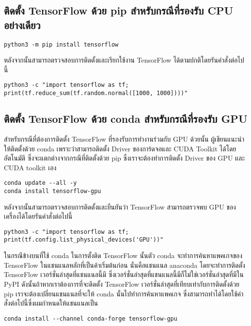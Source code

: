 \subsection{ติดตั้ง TensorFlow ด้วย pip สำหรับกรณีที่รองรับ CPU อย่างเดียว}

\begin{lstlisting}[style=MyBash]
python3 -m pip install tensorflow
\end{lstlisting}

หลังจากนั้นสามารถตรวจสอบการติดตั้งและเรียกใช้งาน TensorFlow ได้ตามปกติโดยรันคำสั่งต่อไปนี้

\begin{lstlisting}[style=MyBash]
python3 -c "import tensorflow as tf; print(tf.reduce_sum(tf.random.normal([1000, 1000])))"
\end{lstlisting}

\subsection{ติดตั้ง TensorFlow ด้วย conda สำหรับกรณีที่รองรับ GPU}

สำหรับกรณีที่ต้องการติดตั้ง TensorFlow ที่รองรับการทำงานร่วมกับ GPU ด้วยนั้น ผู้เขียนแนะนำให้ติดตั้งด้วย conda เพราะว่าสามารถติดตั้ง Driver
ของการ์ดจอและ CUDA Toolkit ได้โดยอัตโนมัติ ซึ่งจะแตกต่างจากกรณีที่ติดตั้งด้วย pip ซึ่งเราจะต้องทำการติดตั้ง Driver ของ GPU และ 
CUDA toolkit เอง

\begin{lstlisting}[style=MyBash]
conda update --all -y
conda install tensorflow-gpu
\end{lstlisting}

หลังจากนั้นสามารถตรวจสอบการติดตั้งและยืนยันว่า TensorFlow สามารถตรวจพบ GPU ของเครื่องได้โดยรันคำสั่งต่อไปนี้

\begin{lstlisting}[style=MyBash]
python3 -c "import tensorflow as tf; print(tf.config.list_physical_devices('GPU'))"
\end{lstlisting}

ในกรณีข้างบนที่ใช้ conda ในการตั้งติด TensorFlow นั้นตัว conda จะทำการค้นหาแพคเกจของ TensorFlow ในแชนแนลหลักที่เป็นค้าเริ่มต้นก่อน
นั่นคือแชนแนล anaconda โดยจะทำการติดตั้ง TensorFlow เวอร์ชั่นล่าสุดที่แชนแนลนี้มี ซึ่งเวอร์ชั่นล่าสุดที่แชนแนลนี้มีก็ไม่ใช่เวอร์ชั่นล่าสุดที่มีใน
PyPI ดังนั้นถ้าหากเราต้องการที่จะติดตั้ง TensorFlow เวอร์ชั่นล่าสุดที่เทียบเท่ากับการติดตั้งด้วย pip เราจะต้องเปลี่ยนแชนแนลที่จะให้ conda
นั้นไปทำการค้นหาแพคเกจ ซึ่งสามารถทำได้โดยใช้คำสั่งต่อไปนี้ซึ่งผมกำหนดให้แชนแนลเป็น 

\begin{lstlisting}[style=MyBash]
    conda install --channel conda-forge tensorflow-gpu
\end{lstlisting}

